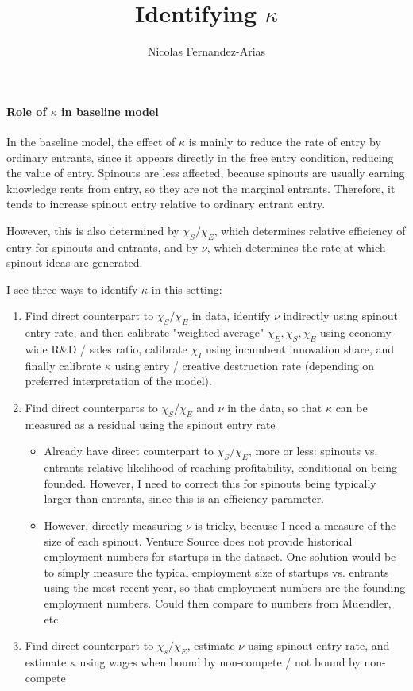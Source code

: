 \documentclass[12pt,english]{article}
\theoremstyle{remark}
\begin{document}
	
\title{Identifying $\kappa$}
\author{Nicolas Fernandez-Arias}
\maketitle

\paragraph{Role of $\kappa$ in baseline model}

In the baseline model, the effect of $\kappa$ is mainly to reduce the rate of entry by ordinary entrants, since it appears directly in the free entry condition, reducing the value of entry. Spinouts are less affected, because spinouts are usually earning knowledge rents from entry, so they are not the marginal entrants. Therefore, it tends to increase spinout entry relative to ordinary entrant entry. 

However, this is also determined by $\chi_S / \chi_E$, which determines relative efficiency of entry for spinouts and entrants, and by $\nu$, which determines the rate at which spinout ideas are generated. 

I see three ways to identify $\kappa$ in this setting:

\begin{enumerate}
	\item Find direct counterpart to $\chi_S / \chi_E$ in data, identify $\nu$ indirectly using spinout entry rate, and then calibrate "weighted average" $\chi_E,\chi_S,\chi_E$ using economy-wide R\&D / sales ratio, calibrate $\chi_I$ using incumbent innovation share, and finally calibrate $\kappa$ using entry / creative destruction rate (depending on preferred interpretation of the model). 
	\item Find direct counterparts to $\chi_S / \chi_E$ and $\nu$ in the data, so that $\kappa$ can be measured as a residual using the spinout entry rate
	\begin{itemize}
		\item Already have direct counterpart to $\chi_S / \chi_E$, more or less: spinouts vs. entrants relative likelihood of reaching profitability, conditional on being founded. However, I need to correct this for spinouts being typically larger than entrants, since this is an efficiency parameter.
		\item However, directly measuring $\nu$ is tricky, because I need a measure of the size of each spinout. Venture Source does not provide historical employment numbers for startups in the dataset. One solution would be to simply measure the typical employment size of startups vs. entrants using the most recent year, so that employment numbers are the founding employment numbers. Could then compare to numbers from Muendler, etc. 
	\end{itemize}
	\item Find direct counterpart to $\chi_s / \chi_E$, estimate $\nu$ using spinout entry rate, and estimate $\kappa$ using wages when bound by non-compete / not bound by non-compete 
\end{enumerate}
\end{document}
